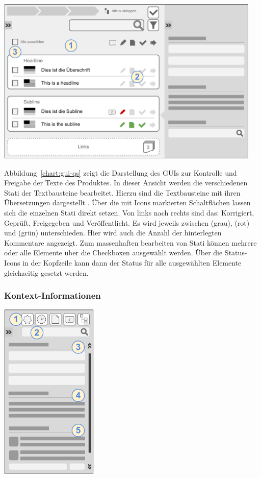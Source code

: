 \begin{center}
\includegraphics[width=0.95\textwidth]{media/GUIFreigabe.pdf}
\label{chart:gui-qs}
\end{center}

Abbildung~\ref{chart:gui-qs} zeigt die Darstellung des GUIs zur Kontrolle und Freigabe der Texte des Produktes. In dieser Ansicht werden die verschiedenen Stati der Textbausteine bearbeitet. Hierzu sind die Textbausteine mit ihren Übersetzungen dargestellt . Über die mit Icons markierten Schaltflächen  lassen sich die einzelnen Stati direkt setzen. Von links nach rechts sind das: Korrigiert, Geprüft, Freigegeben und Veröffentlicht. Es wird jeweils zwischen  (grau),  (rot) und  (grün) unterschieden. Hier wird auch die Anzahl der hinterlegten Kommentare angezeigt. Zum massenhaften bearbeiten von Stati können mehrere oder alle Elemente über die Checkboxen  ausgewählt werden. Über die Status-Icons in der Kopfzeile kann dann der Status für alle ausgewählten Elemente gleichzeitig gesetzt werden.

\subsubsection{Kontext-Informationen}\label{l:gui-kontext}

\begin{center}
\includegraphics[width=0.35\textwidth]{media/GUIKontext-Informationen.pdf}
\label{chart:gui-kontext}
\end{center}

